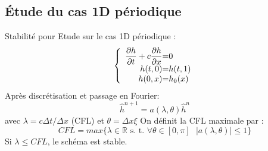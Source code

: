 \documentclass[11pt]{beamer}
\begin{document}
\subsection{\'Etude du cas 1D périodique}
\begin{frame}{Stabilité pour }
Etude sur le cas 1D périodique :
$$
\left \{
\begin{array}{r @{=} l}
\dfrac{\partial h}{\partial t} + c \dfrac{\partial h}{\partial x} & 0\\
h(t,0) & h(t,1)\\
h(0,x) & h_0(x)\\
\end{array}
\right.
$$
Après discrétisation et passage en Fourier:
$$\hat{h}^{n+1} = a(\lambda, \theta) \hat{h}^n$$
avec $\lambda = c \Delta t / \Delta x$ (CFL) et $\theta = \Delta x \xi
$
On définit la CFL maximale par :
$$CFL = max  \{  \lambda \in \mathbb{R} \text{ s. t. } \forall
\theta \in \left[ 0, \pi \right] \text{  } | a( \lambda, \theta ) |
\leq 1 \}$$
Si $\lambda \leq CFL$, le schéma est stable.
\end{frame}
\end{document}
